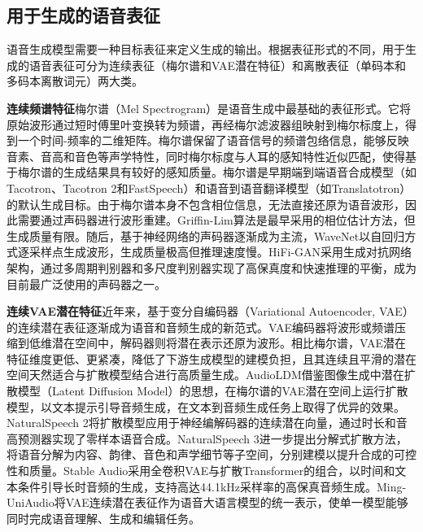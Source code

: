 \subsection{用于生成的语音表征}\label{sec:rw_repr_gen}

语音生成模型需要一种目标表征来定义生成的输出。根据表征形式的不同，用于生成的语音表征可分为连续表征（梅尔谱和VAE潜在特征）和离散表征（单码本和多码本离散词元）两大类。

\textbf{连续频谱特征}\quad 梅尔谱（Mel Spectrogram）是语音生成中最基础的表征形式。它将原始波形通过短时傅里叶变换转为频谱，再经梅尔滤波器组映射到梅尔标度上，得到一个时间-频率的二维矩阵。梅尔谱保留了语音信号的频谱包络信息，能够反映音素、音高和音色等声学特性，同时梅尔标度与人耳的感知特性近似匹配，使得基于梅尔谱的生成结果具有较好的感知质量。梅尔谱是早期端到端语音合成模型（如Tacotron\citep{wang2017tacotron}、Tacotron 2\citep{shen2018tacotron2}和FastSpeech\citep{ren2019fastspeech}）和语音到语音翻译模型（如Translatotron\citep{translatotron}）的默认生成目标。由于梅尔谱本身不包含相位信息，无法直接还原为语音波形，因此需要通过声码器进行波形重建。Griffin-Lim\citep{griffin1984signal}算法是最早采用的相位估计方法，但生成质量有限。随后，基于神经网络的声码器逐渐成为主流，WaveNet\citep{oord2016wavenet}以自回归方式逐采样点生成波形，生成质量极高但推理速度慢。HiFi-GAN\citep{hifigan}采用生成对抗网络架构，通过多周期判别器和多尺度判别器实现了高保真度和快速推理的平衡，成为目前最广泛使用的声码器之一。

\textbf{连续VAE潜在特征}\quad 近年来，基于变分自编码器（Variational Autoencoder, VAE）的连续潜在表征逐渐成为语音和音频生成的新范式。VAE编码器将波形或频谱压缩到低维潜在空间中，解码器则将潜在表示还原为波形。相比梅尔谱，VAE潜在特征维度更低、更紧凑，降低了下游生成模型的建模负担，且其连续且平滑的潜在空间天然适合与扩散模型结合进行高质量生成。AudioLDM\citep{liu2023audioldm}借鉴图像生成中潜在扩散模型（Latent Diffusion Model）的思想，在梅尔谱的VAE潜在空间上运行扩散模型，以文本提示引导音频生成，在文本到音频生成任务上取得了优异的效果。NaturalSpeech 2\citep{shen2024naturalspeech2}将扩散模型应用于神经编解码器的连续潜在向量，通过时长和音高预测器实现了零样本语音合成。NaturalSpeech 3\citep{ju2024naturalspeech3}进一步提出分解式扩散方法，将语音分解为内容、韵律、音色和声学细节等子空间，分别建模以提升合成的可控性和质量。Stable Audio\citep{evans2024stableaudio}采用全卷积VAE与扩散Transformer的组合，以时间和文本条件引导长时音频的生成，支持高达44.1kHz采样率的高保真音频生成。Ming-UniAudio\citep{liang2025mingtok}将VAE连续潜在表征作为语音大语言模型的统一表示，使单一模型能够同时完成语音理解、生成和编辑任务。

